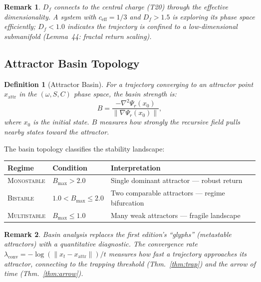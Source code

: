 \documentclass[
  aps,
  prd,
  preprint,
  superscriptaddress,
  nofootinbib,
  floatfix,
  longbibliography
]{revtex4-2}
\newtheorem{definition}[theorem]{Definition}
\newtheorem{remark}{Remark}
\newcommand{\beq}{\begin{equation}}
\newcommand{\eeq}{\end{equation}}
\newcommand{\regime}[1]{\textrm{\upshape\scshape#1}}
\newcommand{\Drft}{\omega}
\newcommand{\Ent}{S}
\newcommand{\Curv}{C}
\newcommand{\ceff}{c_{\mathrm{eff}}}
\newcommand{\Psirec}{\Psi_{r}}
\begin{document}
\begin{remark}
$D_f$ connects to the central charge (T20) through
the effective dimensionality.
A system with $\ceff = 1/3$ and $D_f > 1.5$ is
exploring its phase space efficiently; $D_f < 1.0$
indicates the trajectory is confined to a low-dimensional
submanifold (Lemma~44: fractal return scaling).
\end{remark}

\subsection{Attractor Basin Topology}

\begin{definition}[Attractor Basin]\label{def:basin}
For a trajectory converging to an attractor point
$x_{\mathrm{attr}}$ in the $(\Drft, \Ent, \Curv)$ phase
space, the basin strength is:
\beq
  B = \frac{-\nabla^2 \Psirec(x_0)}
           {\|\nabla \Psirec(x_0)\|},
\eeq
where $x_0$ is the initial state.
$B$ measures how strongly the recursive field pulls
nearby states toward the attractor.
\end{definition}

The basin topology classifies the stability landscape:

\begin{center}
\begin{tabular}{@{}lll@{}}
\toprule
\textbf{Regime} & \textbf{Condition} & \textbf{Interpretation} \\
\midrule
\regime{Monostable}  & $B_{\max} > 2.0$ &
  Single dominant attractor — robust return \\
\regime{Bistable}    & $1.0 < B_{\max} \leq 2.0$ &
  Two comparable attractors — regime bifurcation \\
\regime{Multistable} & $B_{\max} \leq 1.0$ &
  Many weak attractors — fragile landscape \\
\bottomrule
\end{tabular}
\end{center}

\begin{remark}
Basin analysis replaces the first edition's ``glyphs''
(metastable attractors) with a quantitative diagnostic.
The convergence rate
$\lambda_{\mathrm{conv}} = -\log(\|x_t - x_{\mathrm{attr}}\|) / t$
measures how fast a trajectory approaches its attractor,
connecting to the trapping threshold
(Thm.~\ref{thm:trap}) and the arrow of time
(Thm.~\ref{thm:arrow}).
\end{remark}
\end{document}
